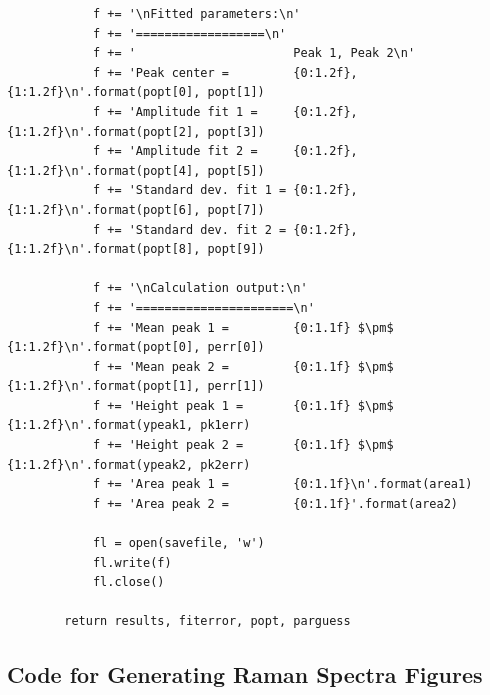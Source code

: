 \documentclass[journal=jpccck,manuscript=suppinfo,email=true]{achemso}
\begin{document}
\begin{verbatim}
            f += '\nFitted parameters:\n'
            f += '==================\n'
            f += '                      Peak 1, Peak 2\n'
            f += 'Peak center =         {0:1.2f}, {1:1.2f}\n'.format(popt[0], popt[1])
            f += 'Amplitude fit 1 =     {0:1.2f}, {1:1.2f}\n'.format(popt[2], popt[3])
            f += 'Amplitude fit 2 =     {0:1.2f}, {1:1.2f}\n'.format(popt[4], popt[5])
            f += 'Standard dev. fit 1 = {0:1.2f}, {1:1.2f}\n'.format(popt[6], popt[7])
            f += 'Standard dev. fit 2 = {0:1.2f}, {1:1.2f}\n'.format(popt[8], popt[9])

            f += '\nCalculation output:\n'
            f += '======================\n'
            f += 'Mean peak 1 =         {0:1.1f} $\pm$ {1:1.2f}\n'.format(popt[0], perr[0])
            f += 'Mean peak 2 =         {0:1.1f} $\pm$ {1:1.2f}\n'.format(popt[1], perr[1])
            f += 'Height peak 1 =       {0:1.1f} $\pm$ {1:1.2f}\n'.format(ypeak1, pk1err)
            f += 'Height peak 2 =       {0:1.1f} $\pm$ {1:1.2f}\n'.format(ypeak2, pk2err)
            f += 'Area peak 1 =         {0:1.1f}\n'.format(area1)
            f += 'Area peak 2 =         {0:1.1f}'.format(area2)

            fl = open(savefile, 'w')
            fl.write(f)
            fl.close()

        return results, fiterror, popt, parguess
\end{verbatim}
\subsection{Code for Generating Raman Spectra Figures}
\label{sec-6-3}
\end{document}
